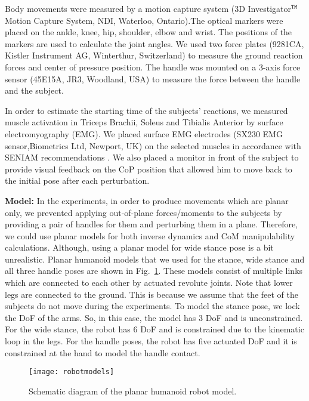 Body movements were measured by a motion capture system (3D Investigator$^{\tt\small TM}$ Motion Capture System, NDI, Waterloo, Ontario).The optical markers were placed on the ankle, knee, hip, shoulder, elbow and wrist. The positions of the markers are used to calculate the joint angles. We used two force plates (9281CA, Kistler Instrument AG, Winterthur, Switzerland) to measure the ground reaction forces and center of pressure position. The handle was mounted on a 3-axis force sensor (45E15A, JR3, Woodland, USA) to measure the force between the handle and the subject.

In order to estimate the starting time of the subjects' reactions, we measured muscle activation in Triceps Brachii, Soleus and Tibialis Anterior by surface electromyography (EMG). We placed surface EMG electrodes (SX230 EMG sensor,Biometrics Ltd, Newport, UK) on the selected muscles in accordance with SENIAM recommendations \cite{Hermensetal99}. We also placed a monitor in front of the subject to provide visual feedback on the CoP position that allowed him to move back to the initial pose after each perturbation.


\textbf{Model:} In the experiments, in order to produce movements which are planar only, we prevented applying out-of-plane forces/moments to the subjects by providing a pair of handles for them and perturbing them in a plane. Therefore, we could use planar models for both inverse dynamics and CoM manipulability calculations. Although, using a planar model for wide stance pose is a bit unrealistic. Planar humanoid models that we used for the stance, wide stance and all three handle poses are shown in Fig.~\ref{planarhumanoids}. These models consist of multiple links which are connected to each other by actuated revolute joints. Note that lower legs are connected to the ground. This is because we assume that the feet of the subjects do not move during the experiments. To model the stance pose, we lock the DoF of the arms. So, in this case, the model has 3 DoF and is unconstrained. For the wide stance, the robot has 6 DoF and is constrained due to the kinematic loop in the legs. For the handle poses, the robot has five actuated DoF and it is constrained at the hand to model the handle contact.
\begin{figure}
	\centering \texttt{[image: robotmodels]}
	\caption{Schematic diagram of the planar humanoid robot model.}
	\label{planarhumanoids}
\end{figure}

